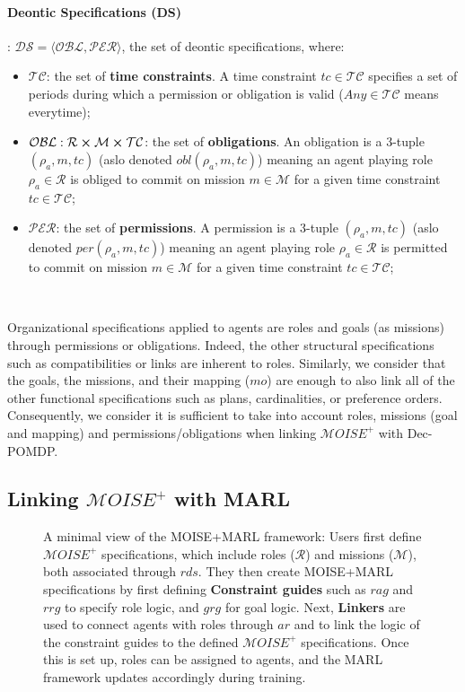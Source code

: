 \documentclass[pdflatex,sn-mathphys-num]{sn-jnl}%
\theoremstyle{thmstyleone}%
\theoremstyle{thmstyletwo}%
\theoremstyle{thmstylethree}%
\begin{document}
\paragraph{\textbf{Deontic Specifications (DS)}}: $\mathcal{DS} = \langle \mathcal{OBL},\mathcal{PER} \rangle$, the set of deontic specifications, where:

\begin{itemize}
    \item $\mathcal{TC}$: the set of \textbf{time constraints}. A time constraint $tc \in \mathcal{TC}$ specifies a set of periods during which a permission or obligation is valid ($Any \in \mathcal{TC}$ means everytime);
    \item $\mathcal{OBL}: \mathcal{R} \cross \mathcal{M} \cross \mathcal{TC}$: the set of \textbf{obligations}. An obligation is a 3-tuple $(\rho_a,m,tc)$ (aslo denoted $obl(\rho_a,m,tc)$) meaning an agent playing role $\rho_a \in \mathcal{R}$ is obliged to commit on mission $m \in \mathcal{M}$ for a given time constraint $tc \in \mathcal{TC}$;
    \item $\mathcal{PER}$: the set of \textbf{permissions}. A permission is a 3-tuple $(\rho_a,m,tc)$ (aslo denoted $per(\rho_a,m,tc)$) meaning an agent playing role $\rho_a \in \mathcal{R}$ is permitted to commit on mission $m \in \mathcal{M}$ for a given time constraint $tc \in \mathcal{TC}$;
\end{itemize}

\

\noindent Organizational specifications applied to agents are roles and goals (as missions) through permissions or obligations. Indeed, the other structural specifications such as compatibilities or links are inherent to roles. Similarly, we consider that the goals, the missions, and their mapping ($mo$) are enough to also link all of the other functional specifications such as plans, cardinalities, or preference orders.
Consequently, we consider it is sufficient to take into account roles, missions (goal and mapping) and permissions/obligations when linking $\mathcal{M}OISE^+$ with Dec-POMDP. 


\subsection{Linking $\mathcal{M}OISE^+$ with MARL}

\begin{figure}[h!]
    \centering
    
    \caption{A minimal view of the MOISE+MARL framework:
        Users first define $\mathcal{M}OISE^+$ specifications, which include roles ($\mathcal{R}$) and missions ($\mathcal{M}$), both associated through $rds$. They then create MOISE+MARL specifications by first defining \textbf{Constraint guides} such as $rag$ and $rrg$ to specify role logic, and $grg$ for goal logic. 
        Next, \textbf{Linkers} are used to connect agents with roles through $ar$ and to link the logic of the constraint guides to the defined $\mathcal{M}OISE^+$ specifications. Once this is set up, roles can be assigned to agents, and the MARL framework updates accordingly during training.
    }
    \label{fig:mm_synthesis}
\end{figure}
\end{document}
